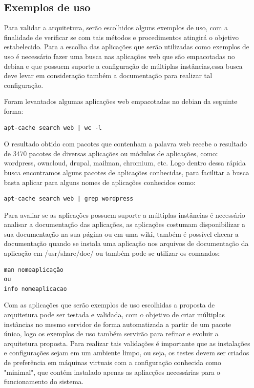 \subsection{Exemplos de uso}

Para validar a arquitetura, serão escolhidos alguns exemplos de uso, com a
finalidade de verificar se com tais métodos e procedimentos atingirá o objetivo
estabelecido. Para a escolha das aplicações que serão utilizadas como exemplos
de uso é necessário fazer uma busca nas aplicações web que são empacotadas no
debian e que possuem suporte a configuração de múltiplas instâncias,essa busca
deve levar em consideração também a documentação para realizar tal configuração.

Foram levantados algumas aplicações web empacotadas no debian da seguinte forma:

\begin{verbatim}
apt-cache search web | wc -l
\end{verbatim}

O resultado obtido com pacotes que contenham a palavra web recebe o resultado de 3470
pacotes de diversas aplicações ou módulos de aplicações, como:
wordpress, owncloud, drupal, mailman, chromium, etc. Logo dentro dessa rápida busca
encontramos alguns pacotes de aplicações conhecidas, para facilitar a busca basta
aplicar para alguns nomes de aplicações conhecidos como:

\begin{verbatim}
apt-cache search web | grep wordpress
\end{verbatim}

Para avaliar se as aplicações possuem suporte a múltiplas instâncias é necessário
analisar a documentação das aplicações, as aplicações costumam disponibilizar a sua
documentação na sua página ou em uma wiki, também é possível checar a documentação
quando se instala uma aplicação nos arquivos de documentação da aplicação em
/usr/share/doc/ ou também pode-se utilizar os comandos:

\begin{verbatim}
man nomeaplicação
ou
info nomeaplicacao
\end{verbatim}

Com as aplicações que serão exemplos de uso escolhidas a proposta de arquitetura
pode ser testada e validada, com o objetivo de criar múltiplas instâncias
no mesmo servidor de forma automatizada a partir de um pacote único, logo os
exemplos de uso também servirão para refinar e evoluir a arquitetura proposta.
Para realizar tais validações é importante que as instalações e configurações
sejam em um ambiente limpo, ou seja, os testes devem ser criados de preferência
em máquinas virtuais com a configuração conhecida como "minimal", que contém
instalado apenas as apliacções necessárias para o funcionamento do sistema.
